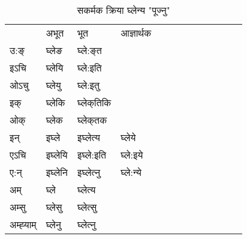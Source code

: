 \begin{table}[H]
\label{e.vt} \centering
\caption{सकर्मक क्रिया  घ्लेन्य  "पूज्नु"  }
\begin{tabular}{l|l|l|l|l|l|l|l|l|l|l|l|l}  \toprule
&अभूत & भूत & आज्ञार्थक \\ 
उ:ङ्‌ &घ्लेङ &घ्ले:ङ्‌त \\ 
इऽचि &घ्लेयि &घ्ले:इति   \\ 
ओऽचु &घ्लेयु &घ्ले:इतु   \\ 
इक् &घ्लेकि &घ्लेक्‌तिकि   \\ 
ओक् &घ्लेक &घ्लेक्‌तक   \\ 
इन् & इघ्ले & इघ्लेत्य &घ्लेये  \\ 
एऽचि & इघ्लेयि & इघ्ले:इति &घ्ले:इये    \\ 
ए:न् & इघ्लेनि  & इघ्लेत्‍नु &घ्ले:न्ये  \\ 
अम् & घ्ले & घ्लेत्य   \\ 
अम्सु & घ्लेसु & घ्लेत्सु     \\ 
अम्ह्‍याम् & घ्लेनु  & घ्लेत्‍नु \\ 
\bottomrule
\end{tabular}
\end{table}


